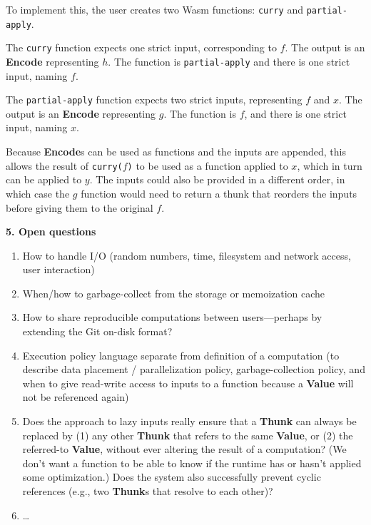 \documentclass{article}
\newcommand{\valuex}{\textbf{Value}\xspace}
\newcommand{\encode}{\textbf{Encode}\xspace}
\newcommand{\thunk}{\textbf{Thunk}\xspace}
\newcommand{\thunks}{\textbf{Thunk}s\xspace}
\newcommand{\encodes}{\textbf{Encode}s\xspace}
\begin{document}
To implement this, the user creates two Wasm functions: \texttt{curry} and \texttt{partial-apply}.

The \texttt{curry} function expects one strict input, corresponding to
$f$.  The output is an \encode representing $h$. The function is
\texttt{partial-apply} and there is one strict input, naming $f$.

The \texttt{partial-apply} function expects two strict inputs,
representing $f$ and $x$. The output is an \encode representing
$g$. The function is $f$, and there is one strict input, naming $x$.

Because \encodes can be used as functions and the inputs are appended,
this allows the result of \texttt{curry($f$)} to be used as a function
applied to $x$, which in turn can be applied to $y$. The inputs could
also be provided in a different order, in which case the $g$ function would
need to return a thunk that reorders the inputs before giving them to
the original $f$.

\vspace{0.5\baselineskip}
{\Large \textbf{5. Open questions}}

\begin{enumerate}[topsep=0pt]
\item How to handle I/O (random numbers, time, filesystem and network access, user interaction)

\item When/how to garbage-collect from the storage or memoization cache

\item How to share reproducible computations between users---perhaps by extending the Git on-disk format?
  
\item Execution policy language separate from definition of a
  computation (to describe data placement / parallelization policy,
  garbage-collection policy, and when to give read-write access to
  inputs to a function because a \valuex will not be referenced again)

\item Does the approach to lazy inputs really ensure that a \thunk can
  always be replaced by (1) any other \thunk that refers to the same
  \valuex, or (2) the referred-to \valuex, without ever altering the
  result of a computation? (We don't want a function to be able to
  know if the runtime has or hasn't applied some optimization.) Does
  the system also successfully prevent cyclic references (e.g., two \thunks that resolve to
  each other)?
  
\item \ldots
  
\end{enumerate}
\end{document}
